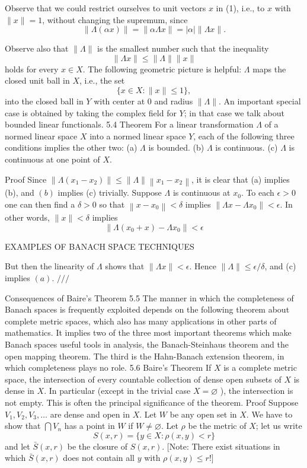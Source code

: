 Observe that we could restrict ourselves to unit vectors $x$ in (1), i.e., to $x$ with $\|x\|=1$, without changing the supremum, since
$$
\|\Lambda(\alpha x)\|=\|\alpha \Lambda x\|=|\alpha|\|\Lambda x\| .
$$

Observe also that $\|\Lambda\|$ is the smallest number such that the inequality
$$
\|\Lambda x\| \leq\|\Lambda\|\|x\|
$$
holds for every $x \in X$.
The following geometric picture is helpful: $\Lambda$ maps the closed unit ball in $X$, i.e., the set
$$
\{x \in X:\|x\| \leq 1\},
$$
into the closed ball in $Y$ with center at 0 and radius $\|\Lambda\|$.
An important special case is obtained by taking the complex field for $Y$; in that case we talk about bounded linear functionals.
5.4 Theorem For a linear transformation $\Lambda$ of a normed linear space $X$ into a normed linear space $Y$, each of the following three conditions implies the other two:
(a) $\Lambda$ is bounded.
(b) $\Lambda$ is continuous.
(c) $\Lambda$ is continuous at one point of $X$.

Proof Since $\left\|\Lambda\left(x_1-x_2\right)\right\| \leq\|\Lambda\|\left\|x_1-x_2\right\|$, it is clear that (a) implies (b), and $(b)$ implies (c) trivially. Suppose $\Lambda$ is continuous at $x_0$. To each $\epsilon>0$ one can then find a $\delta>0$ so that $\left\|x-x_0\right\|<\delta$ implies $\left\|\Lambda x-\Lambda x_0\right\|<\epsilon$. In other words, $\|x\|<\delta$ implies
$$
\left\|\Lambda\left(x_0+x\right)-\Lambda x_0\right\|<\epsilon
$$

EXAMPLES OF BANACH SPACE TECHNIQUES

But then the linearity of $\Lambda$ shows that $\|\Lambda x\|<\epsilon$. Hence $\|\Lambda\| \leq \epsilon / \delta$, and (c) implies $(a)$.
$/ / /$

Consequences of Baire's Theorem
5.5 The manner in which the completeness of Banach spaces is frequently exploited depends on the following theorem about complete metric spaces, which also has many applications in other parts of mathematics. It implies two of the three most important theorems which make Banach spaces useful tools in analysis, the Banach-Steinhaus theorem and the open mapping theorem. The third is the Hahn-Banach extension theorem, in which completeness plays no role.
5.6 Baire's Theorem If $X$ is a complete metric space, the intersection of every countable collection of dense open subsets of $X$ is dense in $X$.
In particular (except in the trivial case $X=\varnothing$ ), the intersection is not empty. This is often the principal significance of the theorem.
Proof Suppose $V_1, V_2, V_3, \ldots$ are dense and open in $X$. Let $W$ be any open set in $X$. We have to show that $\bigcap V_n$ has a point in $W$ if $W \neq \varnothing$.
Let $\rho$ be the metric of $X$; let us write
$$
S(x, r)=\{y \in X: \rho(x, y)<r\}
$$
and let $\bar{S}(x, r)$ be the closure of $S(x, r)$. [Note: There exist situations in which $\bar{S}(x, r)$ does not contain all $y$ with $\rho(x, y) \leq r !]$

